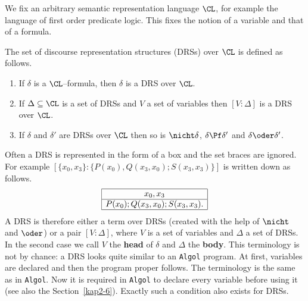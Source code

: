 We fix an arbitrary semantic representation language $\CL$, for
example the language of first order predicate logic. This fixes
the notion of a variable and that of a formula.
\begin{defn}
The set of {\bmi discourse representation structures} ({\bmi DRSs})
{\bmi over} $\CL$ is defined as follows.
\begin{enumerate}
\item
If $\delta$ is a $\CL$--formula, then $\delta$ is a DRS over
    $\CL$.
\item
If $\Delta \subseteq \CL$ is a set of DRSs and $V$ a set of
    variables then $[V : \Delta]$ is a DRS over $\CL$.
\item
If $\delta$ and $\delta'$ are DRSs over $\CL$ then so is
    $\nicht \delta$, $\delta \Pf \delta'$ and
    $\delta \oder \delta'$.
\end{enumerate}
\end{defn}
Often a DRS is represented in the form of a box and the set
braces are ignored. For example $[\{x_0, x_3\} : \{P(x_0),
Q(x_3, x_0); S(x_3,x_3)\}]$ is written down as follows.
$$\begin{array}{|c|}
\hline
x_0, x_3 \\\hline
P(x_0); Q(x_3, x_0); S(x_3,x_3). \\\hline
\end{array}$$
A DRS is therefore either a term over DRSs (created with the
help of $\nicht$ and $\oder$) or a pair $[V : \Delta]$,
where $V$ is a set of variables and $\Delta$ a set of
DRSs. In the second case we call $V$ the {\bf head}
of $\delta$ and $\Delta$ the {\bf body}. This terminology is
not by chance: a DRS looks quite similar to an {\tt Algol}
program. At first, variables are declared and then the program
proper follows. The terminology is the same as in {\tt Algol}.
Now it is required in {\tt Algol} to declare every variable
before using it (see also the Section~\ref{kap2-6}).
Exactly such a condition also exists for DRSs.
